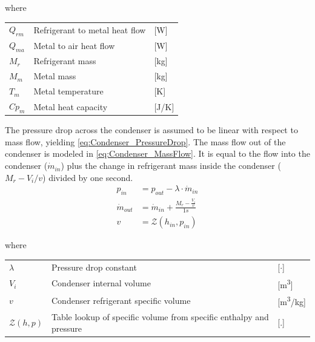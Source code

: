 where
\smallskip
\begin{center}
	\begin{tabular}{l p{8cm} l}
		$Q_{rm}$        & Refrigerant to metal heat flow     & [\si{W}]          \\
		$Q_{ma}$        & Metal to air heat flow             & [\si{W}]          \\
		$M_r$           & Refrigerant mass                   & [\si{kg}]         \\
		$M_m$           & Metal mass                         & [\si{kg}]         \\
		$T_m$           & Metal temperature                  & [\si{K}]          \\
		$Cp_m$          & Metal heat capacity                & [\si{J}/\si{K}]
	\end{tabular}
\end{center}

\medskip

The pressure drop across the condenser is assumed to be linear with respect to mass flow, yielding \cref{eq:Condenser_PressureDrop}.
The mass flow out of the condenser is modeled in \cref{eq:Condenser_MassFlow}. It is equal to the flow into the condenser ($\dot{m}_{in}$) plus the change in refrigerant mass inside the condenser ($M_r - V_i/v$) divided by one second.
\begin{align}
	p_{in} 	& =  p_{out} - \lambda \cdot \dot{m}_{in}  				\label{eq:Condenser_PressureDrop}\\
	\dot{m}_{out}		& = \dot{m}_{in} + \frac{M_r - \frac{V_i}{v}}{1s}		\label{eq:Condenser_MassFlow} \\
	v & = \mathcal{Z}(h_{in}, p_{in})
\end{align}

where
\smallskip
\begin{center}
	\begin{tabular}{l p{8cm} l}
		$\lambda$          & Pressure drop constant                                     & [$\cdot$]          \\
		$V_{i}$            & Condenser internal volume                                  & [\si{m^3}]         \\
		$v$                & Condenser refrigerant specific volume                     & [\si{m^3}/\si{kg}] \\
		$\mathcal{Z}(h,p)$ & Table lookup of specific volume from specific enthalpy and pressure & [.]
	\end{tabular}
\end{center}

